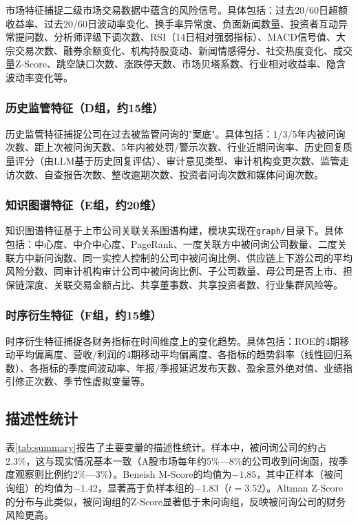 市场特征捕捉二级市场交易数据中蕴含的风险信号。具体包括：过去20/60日超额收益率、过去20/60日波动率变化、换手率异常度、负面新闻数量、投资者互动异常提问数、分析师评级下调次数、RSI（14日相对强弱指标）、MACD信号值、大宗交易次数、融券余额变化、机构持股变动、新闻情感得分、社交热度变化、成交量Z-Score、跳空缺口次数、涨跌停天数、市场贝塔系数、行业相对收益率、隐含波动率变化等。

\subsubsection{历史监管特征（D组，约15维）}

历史监管特征捕捉公司在过去被监管问询的"案底"。具体包括：1/3/5年内被问询次数、距上次被问询天数、5年内被处罚/警示次数、行业近期问询率、历史回复质量评分（由LLM基于历史回复评估）、审计意见类型、审计机构变更次数、监管走访次数、自查报告次数、整改逾期次数、投资者问询次数和媒体问询次数。

\subsubsection{知识图谱特征（E组，约20维）}

知识图谱特征基于上市公司关联关系图谱构建，模块实现在\texttt{graph/}目录下。具体包括：中心度、中介中心度、PageRank、一度关联方中被问询公司数量、二度关联方中新问询数、同一实控人控制的公司中被问询比例、供应链上下游公司的平均风险分数、同审计机构审计公司中被问询比例、子公司数量、母公司是否上市、担保链深度、关联交易金额占比、共享董事数、共享投资者数、行业集群风险等。

\subsubsection{时序衍生特征（F组，约15维）}

时序衍生特征捕捉各财务指标在时间维度上的变化趋势。具体包括：ROE的4期移动平均偏离度、营收/利润的4期移动平均偏离度、各指标的趋势斜率（线性回归系数）、各指标的季度间波动率、年报/季报延迟发布天数、盈余意外绝对值、业绩指引修正次数、季节性虚拟变量等。

\subsection{描述性统计}

表\ref{tab:summary}报告了主要变量的描述性统计。样本中，被问询公司的约占2.3\%，这与现实情况基本一致（A股市场每年约5\%—8\%的公司收到问询函，按季度观察则比例约2\%—3\%）。Beneish M-Score的均值为$-1.85$，其中正样本（被问询组）的均值为$-1.42$，显著高于负样本组的$-1.83$（$t=3.52$）。Altman Z-Score的分布与此类似，被问询组的Z-Score显著低于未问询组，反映被问询公司的财务风险更高。

